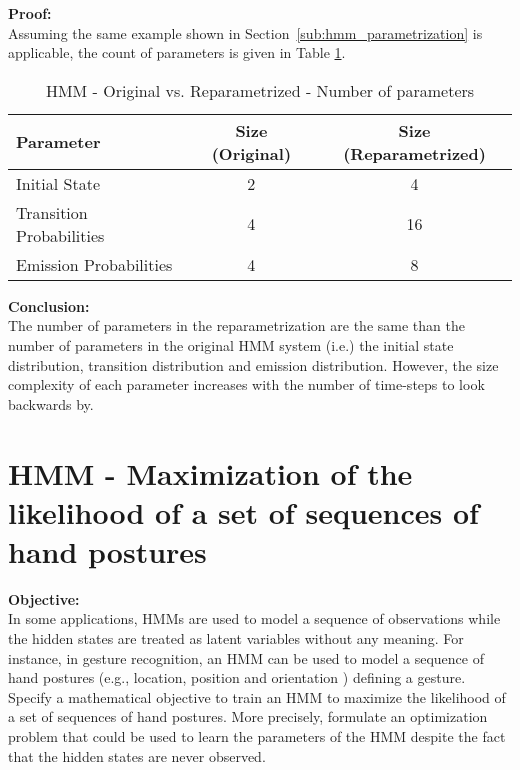 \documentclass[parskip=half]{scrartcl}
\begin{document}
        \textbf{Proof:}\\
        Assuming the same example shown in Section~\ref{sub:hmm_parametrization} is applicable, the count of parameters is given in Table \ref{tab:hmm-original-vs-reparametrized}.
        \begin{table}[th]
            \centering
            \begin{tabular}{| l | c | c |}
            \hline
            \textbf{Parameter} & \textbf{Size (Original)} & \textbf{Size (Reparametrized)} \\
            \hline
            \hline
                Initial State & 2 & 4 \\
            \hline
                Transition Probabilities & 4 & 16 \\
            \hline
                Emission Probabilities & 4 & 8 \\
            \hline
            \end{tabular}
            \caption{HMM - Original vs. Reparametrized - Number of parameters}
            \label{tab:hmm-original-vs-reparametrized}
        \end{table}

        \textbf{Conclusion:}\\
        The number of parameters in the reparametrization are the same than the number of parameters in the original HMM system (i.e.) the initial state distribution, transition distribution and emission distribution. However, the size complexity of each parameter increases with the number of time-steps to look backwards by. 




\newpage


\section{HMM - Maximization of the likelihood of a set of sequences of hand postures} %
\label{sec:hmm_maximization_of_the_likelihood_of_a_set_of_sequences_of_hand_postures}

    \textbf{Objective:}\\
    In some applications, HMMs are used to model a sequence of observations while the hidden states are treated as latent variables without any meaning. For instance, in gesture recognition, an HMM can be used to model a sequence of hand postures (e.g., location, position and orientation ) defining a gesture. Specify a mathematical objective to train an HMM to maximize the likelihood of a set of sequences of hand postures. More precisely, formulate an optimization problem that could be used to learn the parameters of the HMM despite the fact that the hidden states are never observed. 
\end{document}
